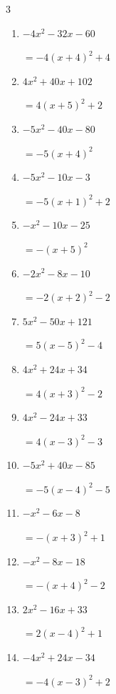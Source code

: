 \begin{multicols}{3}
\begin{enumerate}
  \item $-4x^{2}-32x-60$

        $=-4\left( x+4\right)^{2}+4$

  \item $4x^{2}+40x+102$

        $=4\left( x+5\right)^{2}+2$

  \item $-5x^{2}-40x-80$

        $=-5\left( x+4\right)^{2}$

  \item $-5x^{2}-10x-3$

        $=-5\left( x+1\right)^{2}+2$

  \item $-x^{2}-10x-25$

        $=-\left( x+5\right)^{2}$

  \item $-2x^{2}-8x-10$

        $=-2\left( x+2\right)^{2}-2$

  \item $5x^{2}-50x+121$

        $=5\left( x-5\right)^{2}-4$

  \item $4x^{2}+24x+34$

        $=4\left( x+3\right)^{2}-2$

  \item $4x^{2}-24x+33$

        $=4\left( x-3\right)^{2}-3$

\columnbreak %

\resetques

  \item $-5x^{2}+40x-85$

        $=-5\left( x-4\right)^{2}-5$

  \item $-x^{2}-6x-8$

        $=-\left( x+3\right)^{2}+1$

  \item $-x^{2}-8x-18$

        $=-\left( x+4\right)^{2}-2$

  \item $2x^{2}-16x+33$

        $=2\left( x-4\right)^{2}+1$

  \item $-4x^{2}+24x-34$

        $=-4\left( x-3\right)^{2}+2$


\end{enumerate}
\end{multicols}
